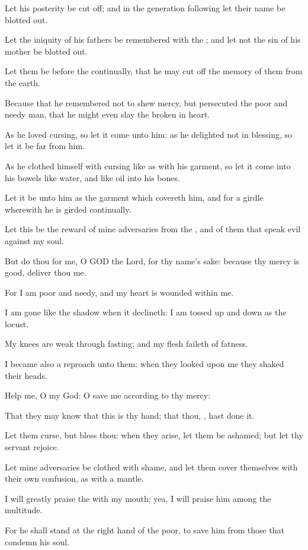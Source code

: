 \verse Let his posterity be cut off; and in the generation following let their name be blotted out.

\verse Let the iniquity of his fathers be remembered with the \LORD; and let not the sin of his mother be blotted out.

\verse Let them be before the \LORD continually, that he may cut off the memory of them from the earth.

\verse Because that he remembered not to shew mercy, but persecuted the poor and needy man, that he might even slay the broken in heart.

\verse As he loved cursing, so let it come unto him: as he delighted not in blessing, so let it be far from him.

\verse As he clothed himself with cursing like as with his garment, so let it come into his bowels like water, and like oil into his bones.

\verse Let it be unto him as the garment which covereth him, and for a girdle wherewith he is girded continually.

\verse Let this be the reward of mine adversaries from the \LORD, and of them that speak evil against my soul.

\verse But do thou for me, O GOD the Lord, for thy name's sake: because thy mercy is good, deliver thou me.

\verse For I am poor and needy, and my heart is wounded within me.

\verse I am gone like the shadow when it declineth: I am tossed up and down as the locust.

\verse My knees are weak through fasting; and my flesh faileth of fatness.

\verse I became also a reproach unto them: when they looked upon me they shaked their heads.

\verse Help me, O \LORD my God: O save me according to thy mercy:

\verse That they may know that this is thy hand; that thou, \LORD, hast done it.

\verse Let them curse, but bless thou: when they arise, let them be ashamed; but let thy servant rejoice.

\verse Let mine adversaries be clothed with shame, and let them cover themselves with their own confusion, as with a mantle.

\verse I will greatly praise the \LORD with my mouth; yea, I will praise him among the multitude.

\verse For he shall stand at the right hand of the poor, to save him from those that condemn his soul.




